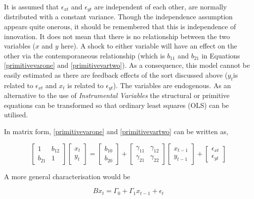 \documentclass[12pt, a4paper, oneside]{article}\usepackage[]{graphicx}\usepackage[]{color}
\begin{document}
It is assumed that $ \epsilon_{xt}$ and $\epsilon_{yt}$ are independent of each other, are normally distributed with a constant variance.   Though the independence assumption appears quite onerous, it should be remembered that this is independence of innovation.  It does not mean that there is no relationship between the two variables ($x$ and $y$ here). A shock to either variable will have an effect on the other via the contemporaneous relationship (which is $b_{11}$ and $b_{21}$ in Equations \ref{primitivevarone} and \ref{primitivevartwo}).  As a consequence, this model cannot be easily estimated as there are feedback effects of the sort discussed above ($y_t$is related to $\epsilon_{xt}$ and $x_t$ is related to $\epsilon_{yt}$).    The variables are endogenous.  As an alternative to the use of  \emph{Instrumental Variables} the structural or primitive equations can be transformed so that ordinary least squares (OLS) can be utilised. 

In matrix form, \ref{primitivevarone} and \ref{primitivevartwo} can be written as, 

\begin{equation}
\label{transitionvar2}
\begin{bmatrix}
 1 & b_{12}\\
 b_{21} & 1
\end{bmatrix}
\begin{bmatrix}
x_{t}\\
y_{t}
\end{bmatrix}=
\begin{bmatrix}
b_{10}\\
b_{20}
\end{bmatrix}+
\begin{bmatrix}
\gamma_{11} & \gamma_{12}\\
\gamma_{21} & \gamma_{22}
\end{bmatrix}
\begin{bmatrix}
x_{t-1}\\
y_{t-1}
\end{bmatrix}+
\begin{bmatrix}
\epsilon_{xt}\\
\epsilon_{yt}
\end{bmatrix}
\end{equation}

A more general characterisation would be 

\begin{equation}\label{transitionvar}
Bx_{t}=\Gamma_{0}+\Gamma_{1}x_{t-1}+\epsilon_{t}
\end{equation}
\end{document}
